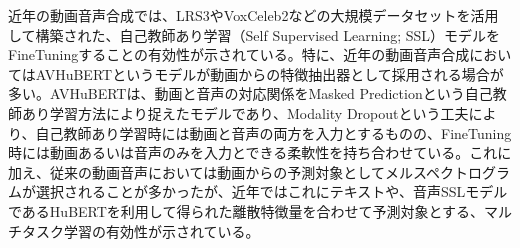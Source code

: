 \documentclass[12pt]{jarticle}
\numberwithin{equation}{section}    %
\numberwithin{figure}{section}      %
\numberwithin{table}{section}      %
\begin{document}

近年の動画音声合成では、LRS3\cite{afouras2018lrs3}やVoxCeleb2\cite{chung2018voxceleb2}などの大規模データセットを活用して構築された、自己教師あり学習（Self Supervised Learning; SSL）モデルをFineTuningすることの有効性が示されている。特に、近年の動画音声合成においてはAVHuBERT\cite{shi2022learning}というモデルが動画からの特徴抽出器として採用される場合が多い。AVHuBERTは、動画と音声の対応関係をMasked Predictionという自己教師あり学習方法により捉えたモデルであり、Modality Dropoutという工夫により、自己教師あり学習時には動画と音声の両方を入力とするものの、FineTuning時には動画あるいは音声のみを入力とできる柔軟性を持ち合わせている。これに加え、従来の動画音声においては動画からの予測対象としてメルスペクトログラムが選択されることが多かったが、近年ではこれにテキストや、音声SSLモデルであるHuBERTを利用して得られた離散特徴量を合わせて予測対象とする、マルチタスク学習の有効性が示されている\cite{kim2023lip_multitask,choi2023intelligible}。
\end{document}
